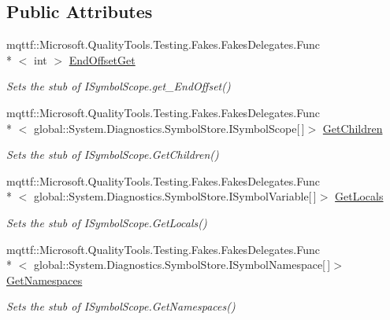 \subsection*{Public Attributes}
\begin{DoxyCompactItemize}
\item 
mqttf\-::\-Microsoft.\-Quality\-Tools.\-Testing.\-Fakes.\-Fakes\-Delegates.\-Func\\*
$<$ int $>$ \hyperlink{class_system_1_1_diagnostics_1_1_symbol_store_1_1_fakes_1_1_stub_i_symbol_scope_a4617ee109d8ebaaea83bbe50fe53ef8f}{End\-Offset\-Get}
\begin{DoxyCompactList}\small\item\em Sets the stub of I\-Symbol\-Scope.\-get\-\_\-\-End\-Offset()\end{DoxyCompactList}\item 
mqttf\-::\-Microsoft.\-Quality\-Tools.\-Testing.\-Fakes.\-Fakes\-Delegates.\-Func\\*
$<$ global\-::\-System.\-Diagnostics.\-Symbol\-Store.\-I\-Symbol\-Scope\mbox{[}$\,$\mbox{]}$>$ \hyperlink{class_system_1_1_diagnostics_1_1_symbol_store_1_1_fakes_1_1_stub_i_symbol_scope_a2e37a64c905c4111c3330afecbea4896}{Get\-Children}
\begin{DoxyCompactList}\small\item\em Sets the stub of I\-Symbol\-Scope.\-Get\-Children()\end{DoxyCompactList}\item 
mqttf\-::\-Microsoft.\-Quality\-Tools.\-Testing.\-Fakes.\-Fakes\-Delegates.\-Func\\*
$<$ global\-::\-System.\-Diagnostics.\-Symbol\-Store.\-I\-Symbol\-Variable\mbox{[}$\,$\mbox{]}$>$ \hyperlink{class_system_1_1_diagnostics_1_1_symbol_store_1_1_fakes_1_1_stub_i_symbol_scope_abcd271e24b26a33940d3fdd244bc8e5a}{Get\-Locals}
\begin{DoxyCompactList}\small\item\em Sets the stub of I\-Symbol\-Scope.\-Get\-Locals()\end{DoxyCompactList}\item 
mqttf\-::\-Microsoft.\-Quality\-Tools.\-Testing.\-Fakes.\-Fakes\-Delegates.\-Func\\*
$<$ global\-::\-System.\-Diagnostics.\-Symbol\-Store.\-I\-Symbol\-Namespace\mbox{[}$\,$\mbox{]}$>$ \hyperlink{class_system_1_1_diagnostics_1_1_symbol_store_1_1_fakes_1_1_stub_i_symbol_scope_a2a34d6471c1281e9d19acdce8ce3baf7}{Get\-Namespaces}
\begin{DoxyCompactList}\small\item\em Sets the stub of I\-Symbol\-Scope.\-Get\-Namespaces()\end{DoxyCompactList}\item 

\end{DoxyCompactItemize}
